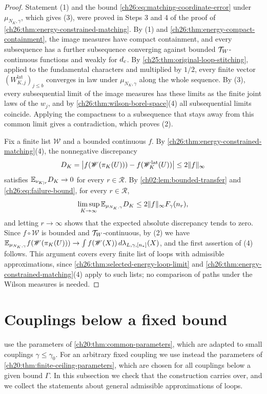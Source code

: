 \begin{proof}
Statement (1) and the bound \eqref{ch26:eq:matching-coordinate-error} under $\mu_{N_K,\gamma}$, which gives (3), were proved in Steps 3 and 4 of the proof of \cref{ch26:thm:energy-constrained-matching}. By (1) and \cref{ch26:thm:energy-compact-containment}, the image measures have compact containment, and every subsequence has a further subsequence converging against bounded $\mathcal T_W$-continuous functions and weakly for $d_c$. By \cref{ch25:thm:original-loop-stitching}, applied to the fundamental characters and multiplied by $1/2$, every finite vector $(W^{\mathrm{lat}}_{K,j})_{j\le b}$ converges in law under $\mu_{N_K,\gamma}$ along the whole sequence. By (3), every subsequential limit of the image measures has these limits as the finite joint laws of the $w_j$, and by \cref{ch26:thm:wilson-borel-space}(4) all subsequential limits coincide. Applying the compactness to a subsequence that stays away from this common limit gives a contradiction, which proves (2).

Fix a finite list $\mathscr W$ and a bounded continuous $f$. By \cref{ch26:thm:energy-constrained-matching}(4), the nonnegative discrepancy
\[
 D_K=\bigl\lvert f(\mathscr W(\pi_K(U)))-f(\mathscr W^{\mathrm{lat}}_K(U))\bigr\rvert\le2\lVert f\rVert_\infty
\]
satisfies $\mathbb E_{\nu_{K\mid r}}D_K\to0$ for every $r\in\mathcal R$. By \cref{ch02:lem:bounded-transfer} and \eqref{ch26:eq:failure-bound}, for every $r\in\mathcal R$,
\[
 \limsup_{K\to\infty}\mathbb E_{\mu_{N_K,\gamma}}D_K\le2\lVert f\rVert_\infty F_\gamma(n_r),
\]
and letting $r\to\infty$ shows that the expected absolute discrepancy tends to zero. Since $f\circ\mathscr W$ is bounded and $\mathcal T_W$-continuous, by (2) we have $\mathbb E_{\mu_{N_K,\gamma}}f(\mathscr W(\pi_K(U)))\to\int f(\mathscr W(X))\,d\lambda_{L,\gamma,[n_*]}(X)$, and the first assertion of (4) follows. This argument covers every finite list of loops with admissible approximations, since \cref{ch26:thm:selected-energy-loop-limit} and \cref{ch26:thm:energy-constrained-matching}(4) apply to such lists; no comparison of paths under the Wilson measures is needed.
\end{proof}

\section{Couplings below a fixed bound}\label{ch26:sec:coupling-bound}

 use the parameters of \cref{ch20:thm:common-parameters}, which are adapted to small couplings $\gamma\le\gamma_0$. For an arbitrary fixed coupling we use instead the parameters of \cref{ch20:thm:finite-ceiling-parameters}, which are chosen for all couplings below a given bound $\Gamma$. In this subsection we check that the construction carries over, and we collect the statements about general admissible approximations of loops.

